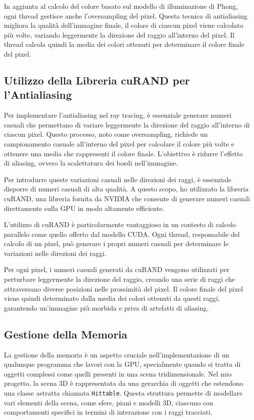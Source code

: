\documentclass{article}
\begin{document}
In aggiunta al calcolo del colore basato sul modello di illuminazione di Phong, ogni thread gestisce anche l'oversampling del pixel. Questa tecnica di antialiasing migliora la qualità dell'immagine finale, il colore di ciascun pixel viene calcolato più volte, variando leggermente la direzione del raggio all'interno del pixel. Il thread calcola quindi la media dei colori ottenuti per determinare il colore finale del pixel.

\subsection{Utilizzo della Libreria cuRAND per l'Antialiasing}

Per implementare l'antialiasing nel ray tracing, è essenziale generare numeri casuali che permettano di variare leggermente la direzione del raggio all'interno di ciascun pixel. Questo processo, noto come oversampling, richiede un campionamento casuale all'interno del pixel per calcolare il colore più volte e ottenere una media che rappresenti il colore finale. L'obiettivo è ridurre l'effetto di aliasing, ovvero la scalettatura dei bordi nell'immagine.

Per introdurre queste variazioni casuali nelle direzioni dei raggi, è essenziale disporre di numeri casuali di alta qualità. A questo scopo, ho utilizzato la libreria cuRAND, una libreria fornita da NVIDIA che consente di generare numeri casuali direttamente sulla GPU in modo altamente efficiente.

L'utilizzo di cuRAND è particolarmente vantaggioso in un contesto di calcolo parallelo come quello offerto dal modello CUDA. Ogni thread, responsabile del calcolo di un pixel, può generare i propri numeri casuali per determinare le variazioni nelle direzioni dei raggi.

Per ogni pixel, i numeri casuali generati da cuRAND vengono utilizzati per perturbare leggermente la direzione del raggio, creando una serie di raggi che attraversano diverse posizioni nelle prossimità del pixel. Il colore finale del pixel viene quindi determinato dalla media dei colori ottenuti da questi raggi, garantendo un'immagine più morbida e priva di artefatti di aliasing.

\subsection{Gestione della Memoria}
La gestione della memoria è un aspetto cruciale nell'implementazione di un qualunque programma che lavori con la GPU, specialmente quando si tratta di oggetti complessi come quelli presenti in una scena tridimensionale. Nel mio progetto, la scena 3D è rappresentata da una gerarchia di oggetti che estendono una classe astratta chiamata \texttt{Hittable}. Questa struttura permette di modellare vari elementi della scena, come sfere, piani e modelli 3D, ciascuno con comportamenti specifici in termini di interazione con i raggi tracciati.
\end{document}
